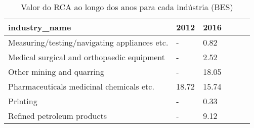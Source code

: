\begin{table}
\centering
\caption{Valor do RCA ao longo dos anos para cada indústria (BES)}
\begin{tabular}{p{6cm}p{1.5cm}p{1.5cm}p{1.5cm}p{1.5cm}p{1.5cm}}
\toprule
                               industry\_name &  2012 &  2016 \\
\midrule
Measuring/testing/navigating appliances etc. &     - &  0.82 \\
  Medical surgical and orthopaedic equipment &     - &  2.52 \\
                   Other mining and quarring &     - & 18.05 \\
    Pharmaceuticals medicinal chemicals etc. & 18.72 & 15.74 \\
                                    Printing &     - &  0.33 \\
                  Refined petroleum products &     - &  9.12 \\
\bottomrule
\end{tabular}
\end{table}
